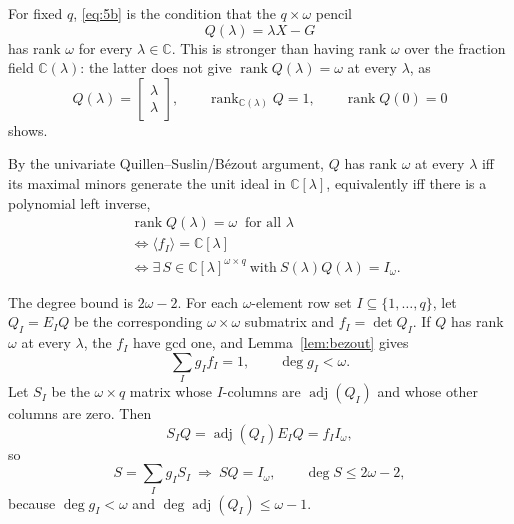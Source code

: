 For fixed $q$, \eqref{eq:5b} is the condition that the $q\times\omega$ pencil
\begin{equation}
Q(\lambda)=\lambda X-G
\end{equation}
has rank $\omega$ for every $\lambda\in\mathbb C$. This is stronger than having rank $\omega$ over the fraction field $\mathbb C(\lambda)$: the latter does not give $\operatorname{rank}Q(\lambda)=\omega$ at every $\lambda$, as
\begin{equation*}
Q(\lambda)=\begin{bmatrix}\lambda\\ \lambda\end{bmatrix},\qquad
\operatorname{rank}_{\mathbb C(\lambda)}Q=1,\qquad \operatorname{rank}Q(0)=0
\end{equation*}
shows.

By the univariate Quillen--Suslin/B\'ezout argument, $Q$ has rank $\omega$ at every $\lambda$ iff its maximal minors generate the unit ideal in $\mathbb C[\lambda]$, equivalently iff there is a polynomial left inverse,
\begin{equation*}
\begin{aligned}
&\operatorname{rank}Q(\lambda)=\omega\ \text{ for all }\lambda\\
&\iff\langle f_I\rangle=\mathbb C[\lambda]\\
&\iff\exists\,S\in\mathbb C[\lambda]^{\omega\times q}\ \text{with}\ S(\lambda)Q(\lambda)=I_\omega .
\end{aligned}
\end{equation*}

The degree bound is $2\omega-2$. For each $\omega$-element row set $I\subseteq\{1,\dots,q\}$, let $Q_I=E_IQ$ be the corresponding $\omega\times\omega$ submatrix and $f_I=\det Q_I$. If $Q$ has rank $\omega$ at every $\lambda$, the $f_I$ have gcd one, and Lemma~\ref{lem:bezout} gives
\begin{equation}
\sum_I g_I f_I=1,\qquad \deg g_I<\omega .
\end{equation}
Let $S_I$ be the $\omega\times q$ matrix whose $I$-columns are $\operatorname{adj}(Q_I)$ and whose other columns are zero. Then
\begin{equation*}
S_IQ=\operatorname{adj}(Q_I)E_IQ=f_II_\omega,
\end{equation*}
so
\begin{equation*}
S=\sum_I g_I S_I\ \Longrightarrow\ SQ=I_\omega,\qquad
\deg S\le2\omega-2,
\end{equation*}
because $\deg g_I<\omega$ and $\deg\operatorname{adj}(Q_I)\le\omega-1$.

